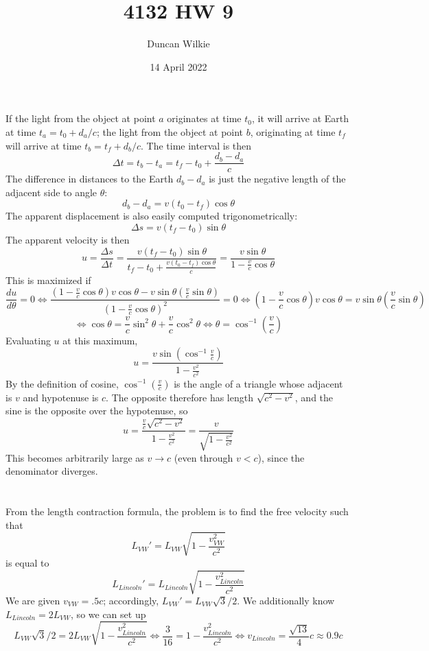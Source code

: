 \documentclass{article}
\title{4132 HW 9}
\author{Duncan Wilkie}
\date{14 April 2022}
\begin{document}
\maketitle

\section{}
If the light from the object at point $a$ originates at time $t_{0}$, it will arrive at Earth at time $t_{a}=t_{0}+d_{a}/c$;
the light from the object at point $b$, originating at time $t_{f}$ will arrive at time $t_{b}=t_{f}+d_{b}/c$.
The time interval is then
\[
  \Delta t=t_{b}-t_{a}=t_{f}-t_{0}+\frac{d_{b}-d_{a}}{c}
\]
The difference in distances to the Earth $d_{b}-d_{a}$ is just the negative length of the adjacent side to angle $\theta$:
\[
  d_{b}-d_{a}=v(t_{0}-t_{f})\cos\theta
\]
The apparent displacement is also easily computed trigonometrically:
\[
  \Delta s=v(t_{f}-t_{0})\sin\theta
\]
The apparent velocity is then
\[
  u=\frac{\Delta s}{\Delta t}=\frac{v(t_{f}-t_{0})\sin\theta}{t_{f}-t_{0}+\frac{v(t_{0}-t_{f})\cos\theta}{c}}
  =\frac{v\sin\theta}{1-\frac{v}{c}\cos\theta}
\]
This is maximized if
\[
  \frac{du}{d\theta}=0
  \Leftrightarrow \frac{\left( 1-\frac{v}{c}\cos\theta \right)v\cos\theta-v\sin\theta\left(\frac{v}{c}\sin\theta  \right)}
  {\left( 1-\frac{v}{c}\cos\theta \right)^{2}}=0
  \Leftrightarrow  \left( 1-\frac{v}{c}\cos\theta \right)v\cos\theta=v\sin\theta\left( \frac{v}{c}\sin\theta \right)
\]
\[
  \Leftrightarrow \cos\theta=\frac{v}{c}\sin^{2}\theta+\frac{v}{c}\cos^{2}\theta
  \Leftrightarrow \theta=\cos^{-1}\left( \frac{v}{c} \right)
\]
Evaluating $u$ at this maximum,
\[
  u=\frac{v\sin\left( \cos^{-1}\frac{v}{c} \right)}{1-\frac{v^{2}}{c^{2}}}
\]
By the definition of cosine, $\cos^{-1}(\frac{v}{c})$ is the angle of a triangle whose adjacent is $v$ and hypotenuse is $c$.
The opposite therefore has length $\sqrt{c^{2}-v^{2}}$, and the sine is the opposite over the hypotenuse, so
\[
  u=\frac{\frac{v}{c}\sqrt{c^{2}-v^{2}}}{1-\frac{v^{2}}{c^{2}}}
  =\frac{v}{\sqrt{1-\frac{v^{2}}{c^{2}}}}
\]
This becomes arbitrarily large as $v\to c$ (even through $v<c$), since the denominator diverges.

\section{}
From the length contraction formula, the problem is to find the free velocity such that
\[
  L_{VW}'=L_{VW}\sqrt{1-\frac{v_{VW}^{2}}{c^{2}}}
\]
is equal to
\[
  L_{Lincoln}'=L_{Lincoln}\sqrt{1-\frac{v_{Lincoln}^{2}}{c^{2}}}
\]
We are given $v_{VW}=.5c$; accordingly, $L_{VW}'=L_{VW}\sqrt{3}/2$.
We additionally know $L_{Lincoln}=2L_{VW}$, so we can set up
\[
  L_{VW}\sqrt{3}/2=2L_{VW}\sqrt{1-\frac{v_{Lincoln}^{2}}{c^{2}}}
  \Leftrightarrow \frac{3}{16}=1-\frac{v_{Lincoln}^{2}}{c^{2}}
  \Leftrightarrow v_{Lincoln}=\frac{\sqrt{13}}{4}c\approx 0.9c
\]
\end{document}
